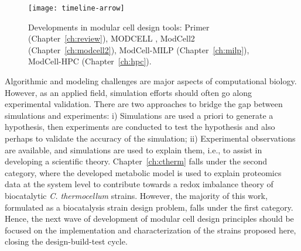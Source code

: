 \begin{figure}[h]
  \centering
  \texttt{[image: timeline-arrow]}
    \caption[Developments in modular cell design tools]{Developments in modular cell design tools: Primer (Chapter~\ref{ch:review}), MODCELL \citep{trinh2015}, ModCell2 (Chapter~\ref{ch:modcell2}), ModCell-MILP (Chapter~\ref{ch:milp}), ModCell-HPC (Chapter~\ref{ch:hpc}).}
    \label{fig8:arrow}
\end{figure}



Algorithmic and modeling challenges are major aspects of computational biology.
However, as an applied field, simulation efforts should often go along experimental validation.
There are two approaches to bridge the gap between simulations and experiments:
i) Simulations are used a priori to generate a hypothesis, then experiments are conducted to test the hypothesis and also perhaps to validate the accuracy of the simulation;
ii) Experimental observations are available, and simulations are used to explain them, i.e., to assist in developing a scientific theory.
Chapter~\ref{ch:ctherm} falls under the second category, where the developed metabolic model is used to explain proteomics data at the system level to contribute towards a redox imbalance theory of biocatalytic \textit{C. thermocellum} strains. %
However, the majority of this work, formulated as a biocatalysis strain design problem, falls under the first category.
Hence, the next wave of development of modular cell design principles should be focused on the implementation and characterization of the strains proposed here, closing the design-build-test cycle.



